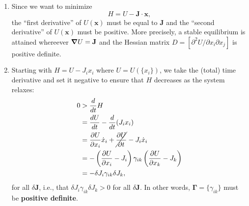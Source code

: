 \documentclass{article}
\theoremstyle{definition}
\newcommand{\p}{\partial}
\newcommand{\f}[2]{\frac{#1}{#2}}
\newcommand{\lp}{\left(}
\newcommand{\rp}{\right)}
\begin{document}
\begin{enumerate}[label=(\alph*)]
	\item Since we want to minimize  
	\begin{equation*}
	H = U - \mathbf{J}\cdot \mathbf{x},
	\end{equation*}
	the ``first derivative'' of $U(\mathbf{x})$ must be equal to $\mathbf{J}$ and the ``second derivative'' of $U(\mathbf{x})$ must be positive. More precisely, a stable equilibrium is attained whereever $\grad U = \mathbf{J}$ and the Hessian matrix $D = [\p^2 U /\p x_i \p x_j]$ is positive definite. 
	
	
	\item Starting with $H = U - J_i x_i$ where $U = U(\{x_i\})$, we take the (total) time derivative and set it negative to ensure that $H$ decreases as the system relaxes:
	\begin{align*}
	0 &> \f{d}{dt}H \\
	&= \f{dU}{dt}   - \f{d}{dt}(J_i x_i) \\
	&= \f{\p U}{\p x_i}\dot{x}_i + \cancel{\f{\p U}{\p t}} - J_i \dot{x}_i\\
	&= -\lp \f{\p U}{\p x_i} - J_i \rp \gamma_{ik} \lp \f{\p U}{\p x_k} - J_k \rp\\
	&= -\delta J_i \gamma_{ik} \delta J_k,
	\end{align*}
	for all $\delta \mathbf{J}$, i.e., that $\delta J_i \gamma_{ik} \delta J_k > 0$ for all $\delta \mathbf{J}$. In other words, $\mathbf{\Gamma} = \{ \gamma_{ik}\}$ must be \textbf{positive definite}. 
	
	
	

\end{enumerate}
\end{document}
